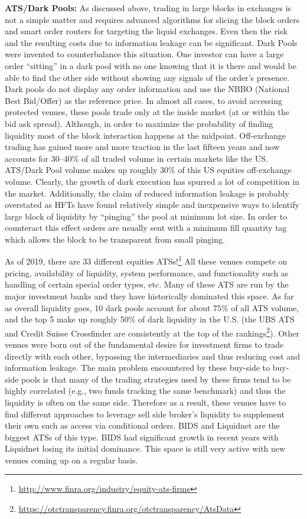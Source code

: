 \noindent\textbf{ATS/Dark Pools:} As discussed above, trading in large blocks in exchanges is not a simple matter and requires advanced algorithms for slicing the block orders and smart order routers for targeting the liquid exchanges. Even then the risk and the resulting costs due to information leakage can be significant. Dark Pools were invented to counterbalance this situation. One investor can have a large order ``sitting'' in a dark pool with no one knowing that it is there and would be able to find the other side without showing any signals of the order's presence. Dark pools do not display any order information and use the NBBO (National Best Bid/Offer) as the reference price. In almost all cases, to avoid accessing protected venues, these pools trade only at the inside market (at or within the bid ask spread). Although, in order to maximize the probability of finding liquidity most of the block interaction happens at the midpoint. Off-exchange trading has gained more and more traction in the last fifteen years and now accounts for 30--40\% of all traded volume in certain markets like the US. ATS/Dark Pool volume makes up roughly 30\% of this US equities off-exchange volume. Clearly, the growth of dark execution has spurred a lot of competition in the market. Additionally, the claim of reduced information leakage is probably overstated as HFTs have found relatively simple and inexpensive ways to identify large block of liquidity by ``pinging'' the pool at minimum lot size. In order to counteract this effect orders are usually sent with a minimum fill quantity tag which allows the block to be transparent from small pinging.


As of 2019, there are 33 different equities ATSs!\footnote{\url{http://www.finra.org/industry/equity-ats-firms}} All these venues compete on pricing, availability of liquidity, system performance, and functionality such as handling of certain special order types, etc. Many of these ATS are run by the major investment banks and they have historically dominated this space. As far as overall liquidity goes, 10 dark pools account for about 75\% of all ATS volume, and the top 5 make up roughly 50\% of dark liquidity in the U.S. (the UBS ATS and Credit Suisse Crossfinder are consistently at the top of the rankings\footnote{\url{https://otctransparency.finra.org/otctransparency/AtsData}}). Other venues were born out of the fundamental desire for investment firms to trade directly with each other, bypassing the intermediaries and thus reducing cost and information leakage.  The main problem encountered by these buy-side to buy-side pools is that many of the trading strategies used by these firms tend to be highly correlated (e.g., two funds tracking the same benchmark) and thus the liquidity is often on the same side. Therefore as a result, these venues have to find different approaches to leverage sell side broker's liquidity to supplement their own such as access via conditional orders. BIDS and Liquidnet are the biggest ATSs of this type. BIDS had significant growth in recent years with Liquidnet losing its initial dominance. This space is still very active with new venues coming up on a regular basis. \twomedskip


